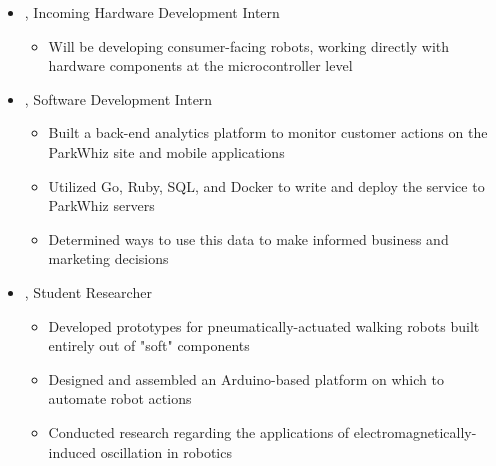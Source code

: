 \documentclass[10pt,letterpaper]{article}
\begin{document}
\begin{itemize}[label={}]
 \item \small{, Incoming Hardware Development Intern  \hfill {}}
 \vspace{-1.58mm}
 \begin{itemize}[label={}]
 	\item \small{Will be developing consumer-facing robots, working directly with hardware components at the microcontroller level}
 \end{itemize}
 \item \small{, Software Development Intern  \hfill {}}
 \vspace{-1.58mm}
 \begin{itemize}[label={}]
 	\item \small{Built a back-end analytics platform to monitor customer actions on the ParkWhiz site and mobile applications}
 	\item \small{Utilized Go, Ruby, SQL, and Docker to write and deploy the service to ParkWhiz servers}
 	\item \small{Determined ways to use this data to make informed business and marketing decisions}
 \end{itemize}
 \item \small{, Student Researcher  \hfill {}}
 \vspace{-1.58mm}
 \begin{itemize}[label={}]
 	\item \small{Developed prototypes for pneumatically-actuated walking robots built entirely out of "soft" components}
 	\item \small{Designed and assembled an Arduino-based platform on which to automate robot actions}
 	\item \small{Conducted research regarding the applications of electromagnetically-induced oscillation in robotics}
 \end{itemize}
\end{itemize}
\end{document}
